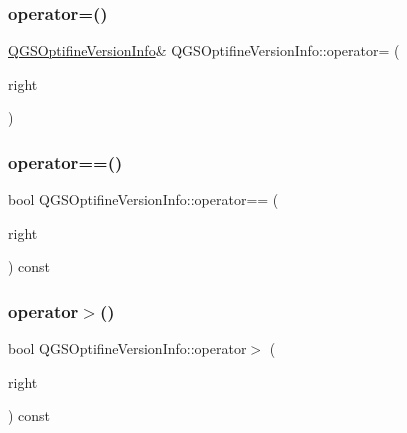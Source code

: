 \mbox{\label{class_q_g_s_optifine_version_info_a1d7fb8a19b87bc2275a19e9f03560a95}} 
\subsubsection{\texorpdfstring{operator=()}{operator=()}\hspace{0.1cm}{\footnotesize\ttfamily [2/2]}}
{\footnotesize\ttfamily \mbox{\hyperlink{class_q_g_s_optifine_version_info}{Q\+G\+S\+Optifine\+Version\+Info}}\& Q\+G\+S\+Optifine\+Version\+Info\+::operator= (\begin{DoxyParamCaption}\item[{\mbox{\hyperlink{class_q_g_s_optifine_version_info}{Q\+G\+S\+Optifine\+Version\+Info}} \&\&}]{right }\end{DoxyParamCaption})\hspace{0.3cm}{\ttfamily [default]}}

\mbox{\label{class_q_g_s_optifine_version_info_acf7e6566d898467299fa07b50953b48b}} 
\subsubsection{\texorpdfstring{operator==()}{operator==()}}
{\footnotesize\ttfamily bool Q\+G\+S\+Optifine\+Version\+Info\+::operator== (\begin{DoxyParamCaption}\item[{const \mbox{\hyperlink{class_q_g_s_optifine_version_info}{Q\+G\+S\+Optifine\+Version\+Info}} \&}]{right }\end{DoxyParamCaption}) const}

\mbox{\label{class_q_g_s_optifine_version_info_adbc88aa7aebb96d58640c19ce1bb8b11}} 
\subsubsection{\texorpdfstring{operator$>$()}{operator>()}}
{\footnotesize\ttfamily bool Q\+G\+S\+Optifine\+Version\+Info\+::operator$>$ (\begin{DoxyParamCaption}\item[{const \mbox{\hyperlink{class_q_g_s_optifine_version_info}{Q\+G\+S\+Optifine\+Version\+Info}} \&}]{right }\end{DoxyParamCaption}) const}

